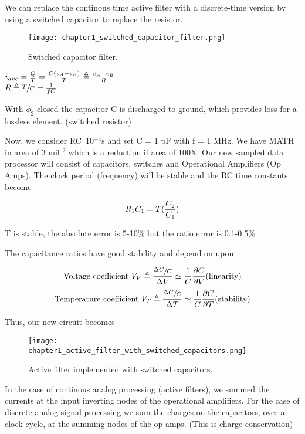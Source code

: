 \documentclass[11pt,fleqn]{book} %
\begin{document}
We can replace the continous time active filter with a discrete-time version by using a switched capacitor to replace the resistor.\\

\begin{figure}[h]
  \centering\texttt{[image: chapter1\_switched\_capacitor\_filter.png]}
  \caption{Switched capacitor filter.}
\end{figure}

\begin{multicols}{2}
  \centering $i_{ave}={Q\over T}={C(v_A-v_B)\over T}\triangleq {v_A-v_B\over R}$ \\ $R\triangleq \sfrac{T}{C}={1\over fC}$ \columnbreak \\
  \raggedright With $\phi_2$ closed the capacitor C is discharged to ground, which provides loss for a lossless element. (switched resistor)
\end{multicols}

Now, we consider RC~10$^{-4}$s and set C = 1 pF with f = 1 MHz. We have MATH in area of 3 mil $^2$ which is a reduction if area of 100X. Our new sampled data processor will consist of capacitors, switches and Operational Amplifiers (Op Amps). The clock period (frequency) will be stable and the RC time constants become

$$R_1C_1=T({C_2\over C_1})$$

T is stable, the absolute error is 5-10\% but the ratio error is 0.1-0.5\%

The capacitance ratios have good stability and depend on upon

$$\text{Voltage coefficient } V_V\triangleq{\sfrac{\Delta C}{C}\over \Delta V } \simeq {1\over C}{\partial C\over \partial V} \text{(linearity)}$$
$$\text{Temperature coefficient } V_T\triangleq{\sfrac{\Delta C}{C}\over \Delta T } \simeq {1\over C}{\partial C\over \partial T} \text{(stability)}$$

Thus, our new circuit becomes

\begin{figure}[h]
  \centering\texttt{[image: chapter1\_active\_filter\_with\_switched\_capacitors.png]}
  \caption{Active filter implemented with switched capacitors.}
\end{figure}

In the case of continous analog processing (active filters), we summed the currents at the input inverting nodes of the operational amplifiers. For the case of discrete analog signal processing we sum the charges on the capacitors, over a clock cycle, at the summing nodes of the op amps. (This is charge conservation)
\end{document}

